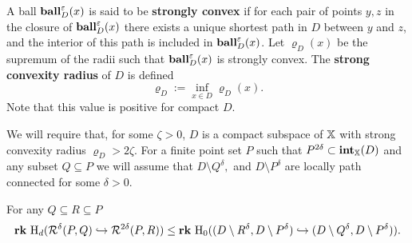 A ball $\mathbf{ball}_D^\varepsilon(x)$ is said to be \textbf{strongly convex} if for each pair of points $y,z$ in the closure of $\mathbf{ball}_D^\varepsilon(x)$ there exists a unique shortest path in $D$ between $y$ and $z$, and the interior of this path is included in $\mathbf{ball}_D^\varepsilon(x)$.
Let $\varrho_D(x)$ be the supremum of the radii such that $\mathbf{ball}_D^\varepsilon(x)$ is strongly convex.
The \textbf{strong convexity radius} of $D$ is defined
\[ \varrho_D := \inf_{x\in D} \varrho_D(x).\]
Note that this value is positive for compact $D$.

We will require that, for some $\zeta > 0$, $D$ is a compact subspace of $\mathbb{X}$ with strong convexity radius $\varrho_D > 2\zeta$.
For a finite point set $P$ such that $P^{2\delta}\subset \mathbf{int}_{\mathbb{X}}(D)$ and any subset $Q\subseteq P$ we will assume that $D\setminus Q^\delta,$ and $D\setminus P^\delta$ are locally path connected for some $\delta > 0$.


\begin{lemma}
  For any $Q\subseteq R\subseteq P$
  \[\mathbf{rk}~\mathrm{H}_d(\mathcal{R}^\delta(P, Q)\hookrightarrow \mathcal{R}^{2\delta}(P, R))\leq \mathbf{rk}~\mathrm{H}_0((D\setminus R^{\delta}, D\setminus P^{\delta})\hookrightarrow (D\setminus Q^\delta, D\setminus P^\delta)).\]
\end{lemma}
